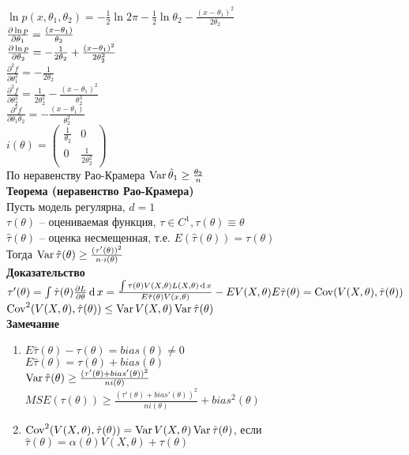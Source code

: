 \documentclass[12pt]{article}
\begin{document}
$\ln p(x, \theta_1, \theta_2) = -\frac12 \ln 2\pi - \frac12\ln \theta_2 - \frac{(x-\theta_1)^2}{2\theta_2}$\\
$\frac{\partial \ln p}{\partial \theta_1} = \frac{(x-\theta_1)}{\theta_2}$\\
$\frac{\partial \ln p}{\partial \theta_2} = -\frac1{2\theta_2} + \frac{(x-\theta_1)^2}{2\theta_2^2}$\\
$\frac{\partial^2 f}{\partial \theta_1^2} = -\frac{1}{2\theta_2}$\\
$\frac{\partial^2 f}{\partial \theta_2^2} = \frac1{2\theta_2^2} - \frac{(x-\theta_1)^2}{\theta_2^3}$\\
$\frac{\partial^2 f}{\partial \theta_1\theta_2} = -\frac{(x-\theta_1)}{\theta_2^2}$\\
$i(\theta) = \begin{pmatrix}
	\frac{1}{\theta_2} & 0\\
	0 & \frac{1}{2\theta_2^2}
\end{pmatrix}$\\
По неравенству Рао-Крамера $\operatorname{Var} \hat \theta_1 \geq \frac{\theta_2}{n}$\\
\textbf{Теорема (неравенство Рао-Крамера)}\\
Пусть модель регулярна, $d=1$\\
$\tau(\theta)$ -- оцениваемая функция, $\tau \in C^1, \tau(\theta) \equiv \theta$\\
$\hat \tau(\theta)$ -- оценка несмещенная, т.е. $E(\hat \tau(\theta)) = \tau(\theta)$\\
Тогда $\operatorname{Var} \hat \tau(\theta) \geq \frac{(\tau'(\theta))^2}{n\cdot i(\theta)}$\\
\textbf{Доказательство}\\
$\tau'(\theta) = \int \hat \tau(\theta) \frac{\partial L}{\partial \theta} \operatorname{d} x = \frac{\int \tau(\theta) V(X, \theta)L(X, \theta) \operatorname{d} x}{E\hat \tau(\theta) V(x, \theta)} - EV(X, \theta)E\hat \tau(\theta) = \operatorname{Cov} (V(X, \theta), \hat \tau(\theta))$\\
$\operatorname{Cov}^2 (V(X, \theta), \hat \tau(\theta)) \leq \operatorname{Var} V(X, \theta) \operatorname{Var} \hat \tau(\theta)$\\
\textbf{Замечание}
\begin{enumerate}
	\item $E\hat \tau(\theta) - \tau(\theta) = bias(\theta) \neq 0$\\
	$E\hat \tau(\theta) = \tau(\theta) + bias(\theta)$\\
	$\operatorname{Var} \hat \tau(\theta) \geq \frac{(\tau'(\theta) + bias'(\theta))^2}{ni(\theta)}$\\
	$MSE(\tau(\theta)) \geq \frac{(\tau'(\theta) + bias'(\theta))^2}{ni(\theta)} + bias^2(\theta)$
	\item $\operatorname{Cov}^2 (V(X, \theta), \hat \tau(\theta)) = \operatorname{Var} V(X, \theta) \operatorname{Var} \hat \tau(\theta)$, если $\hat\tau(\theta) = \alpha(\theta) V(X, \theta) + \tau(\theta)$
\end{enumerate}
\end{document}

